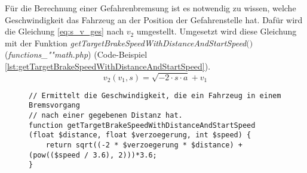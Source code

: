 \noindent Für die Berechnung einer Gefahrenbremsung ist es notwendig zu wissen, welche Geschwindigkeit das Fahrzeug an der Position der Gefahrenstelle hat. Dafür wird die Gleichung \eqref{eq:s_v_ges} nach $v_{2}$ umgestellt. Umgesetzt wird diese Gleichung mit der Funktion \textit{get\-Tar\-get\-Brake\-Speed\-With\-Dis\-tance\-And\-Start\-Speed$($$)$} (\textit{func\-tions\_""math\-.php}) (Code-Beispiel \ref{lst:getTargetBrakeSpeedWithDistanceAndStartSpeed}).
\begin{equation}
\label{eq:gefahrenbremsung}
v_{2}(v_{1}, s) = \sqrt{-2 \cdot s \cdot a} + v_{1}
\end{equation}
\begin{figure}[H]
\begin{lstlisting}[caption={\textit{getTargetBrakeSpeedWithDistanceAndStartSpeed$($$)$} (\textit{func\-tions\_""math\-.php})},captionpos=b,label={lst:getTargetBrakeSpeedWithDistanceAndStartSpeed}]
// Ermittelt die Geschwindigkeit, die ein Fahrzeug in einem Bremsvorgang
// nach einer gegebenen Distanz hat.
function getTargetBrakeSpeedWithDistanceAndStartSpeed (float $distance, float $verzoegerung, int $speed) {
	return sqrt((-2 * $verzoegerung * $distance) + (pow(($speed / 3.6), 2)))*3.6;
}
\end{lstlisting}
\end{figure}
